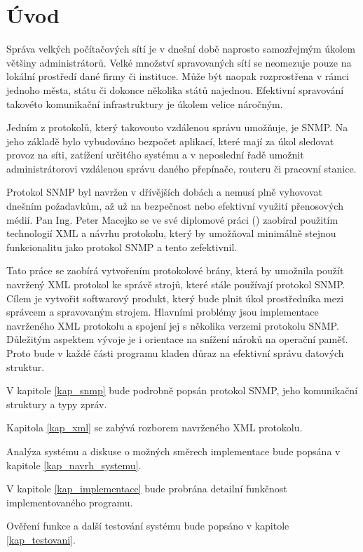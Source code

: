 \chapter{Úvod}
Správa velkých počítačových sítí je v dnešní době naprosto samozřejmým úkolem většiny administrátorů. Velké množství spravovaných sítí se neomezuje pouze na lokální prostředí dané firmy či instituce. Může být naopak rozprostřena 
v rámci jednoho města, státu či dokonce několika států najednou. Efektivní spravování takovéto komunikační infrastruktury je úkolem velice náročným.

Jedním z protokolů, který takovouto vzdálenou správu umožňuje, je SNMP. Na jeho základě bylo vybudováno bezpočet aplikací, které mají za úkol sledovat provoz na síti, zatížení určitého systému a v neposlední řadě umožnit administrátorovi
vzdálenou správu daného přepínače, routeru či pracovní stanice.

Protokol SNMP byl navržen v dřívějších dobách a nemusí plně vyhovovat dnešním požadavkům, až už na bezpečnost nebo efektivní využití přenosových médií. Pan Ing. Peter Macejko se ve své diplomové práci (\cite{macejko_dipl}) zaobíral použitím 
technologií XML a návrhu protokolu, který by umožňoval minimálně stejnou funkcionalitu jako protokol SNMP a tento zefektivnil.

Tato práce se zaobírá vytvořením protokolové brány, která by umožnila použít navržený XML protokol ke správě strojů, které stále používají protokol SNMP. Cílem je vytvořit softwarový produkt, který bude plnit úkol prostředníka mezi správcem a spravovaným
strojem. Hlavními problémy jsou implementace navrženého XML protokolu a spojení jej s několika verzemi protokolu SNMP. Důležitým aspektem vývoje je i orientace na snížení nároků na operační paměť. Proto bude v každé části programu kladen důraz na efektivní správu
datových struktur.

V kapitole \ref{kap_snmp} bude podrobně popsán protokol SNMP, jeho komunikační struktury a typy zpráv.

Kapitola \ref{kap_xml} se zabývá rozborem navrženého XML protokolu. 

Analýza systému a diskuse o možných směrech implementace bude popsána v kapitole \ref{kap_navrh_systemu}.

V kapitole \ref{kap_implementace} bude probrána detailní funkčnost implementovaného programu.

Ověření funkce a další testování systému bude popsáno v kapitole \ref{kap_testovani}.

